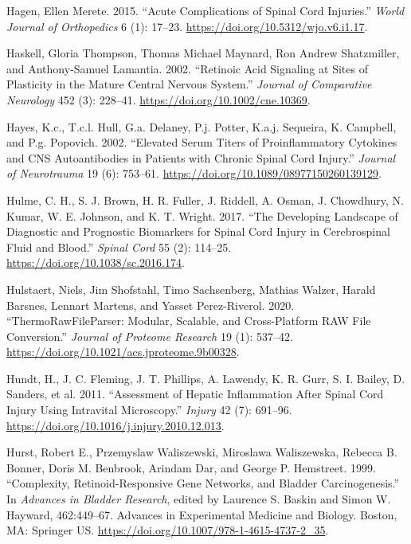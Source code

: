 \documentclass[
]{article}
\newlength{\cslhangindent}
\newlength{\cslentryspacingunit} %
\newenvironment{CSLReferences}[2] %
 {%
  \setlength{\parindent}{0pt}
  \ifodd #1
  \let\oldpar\par
  \def\par{\hangindent=\cslhangindent\oldpar}
  \fi
  \setlength{\parskip}{#2\cslentryspacingunit}
 }%
 {}
\begin{document}
\begin{landscape}
\begin{landscape}
\begin{CSLReferences}{1}{0}
\leavevmode{}%
Hagen, Ellen Merete. 2015. {``Acute Complications of Spinal Cord Injuries.''} \emph{World Journal of Orthopedics} 6 (1): 17--23. \url{https://doi.org/10.5312/wjo.v6.i1.17}.

\leavevmode{}%
Haskell, Gloria Thompson, Thomas Michael Maynard, Ron Andrew Shatzmiller, and Anthony-Samuel Lamantia. 2002. {``Retinoic Acid Signaling at Sites of Plasticity in the Mature Central Nervous System.''} \emph{Journal of Comparative Neurology} 452 (3): 228--41. \url{https://doi.org/10.1002/cne.10369}.

\leavevmode{}%
Hayes, K.c., T.c.l. Hull, G.a. Delaney, P.j. Potter, K.a.j. Sequeira, K. Campbell, and P.g. Popovich. 2002. {``Elevated {Serum Titers} of {Proinflammatory Cytokines} and {CNS Autoantibodies} in {Patients} with {Chronic Spinal Cord Injury}.''} \emph{Journal of Neurotrauma} 19 (6): 753--61. \url{https://doi.org/10.1089/08977150260139129}.

\leavevmode{}%
Hulme, C. H., S. J. Brown, H. R. Fuller, J. Riddell, A. Osman, J. Chowdhury, N. Kumar, W. E. Johnson, and K. T. Wright. 2017. {``The Developing Landscape of Diagnostic and Prognostic Biomarkers for Spinal Cord Injury in Cerebrospinal Fluid and Blood.''} \emph{Spinal Cord} 55 (2): 114--25. \url{https://doi.org/10.1038/sc.2016.174}.

\leavevmode{}%
Hulstaert, Niels, Jim Shofstahl, Timo Sachsenberg, Mathias Walzer, Harald Barsnes, Lennart Martens, and Yasset Perez-Riverol. 2020. {``{ThermoRawFileParser}: {Modular}, {Scalable}, and {Cross-Platform RAW File Conversion}.''} \emph{Journal of Proteome Research} 19 (1): 537--42. \url{https://doi.org/10.1021/acs.jproteome.9b00328}.

\leavevmode{}%
Hundt, H., J. C. Fleming, J. T. Phillips, A. Lawendy, K. R. Gurr, S. I. Bailey, D. Sanders, et al. 2011. {``Assessment of Hepatic Inflammation After Spinal Cord Injury Using Intravital Microscopy.''} \emph{Injury} 42 (7): 691--96. \url{https://doi.org/10.1016/j.injury.2010.12.013}.

\leavevmode{}%
Hurst, Robert E., Przemyslaw Waliszewski, Miroslawa Waliszewska, Rebecca B. Bonner, Doris M. Benbrook, Arindam Dar, and George P. Hemstreet. 1999. {``Complexity, {Retinoid-Responsive Gene Networks}, and {Bladder Carcinogenesis}.''} In \emph{Advances in {Bladder Research}}, edited by Laurence S. Baskin and Simon W. Hayward, 462:449--67. Advances in {Experimental Medicine} and {Biology}. {Boston, MA}: {Springer US}. \url{https://doi.org/10.1007/978-1-4615-4737-2_35}.


\end{CSLReferences}
\end{landscape}
\end{landscape}
\end{document}

